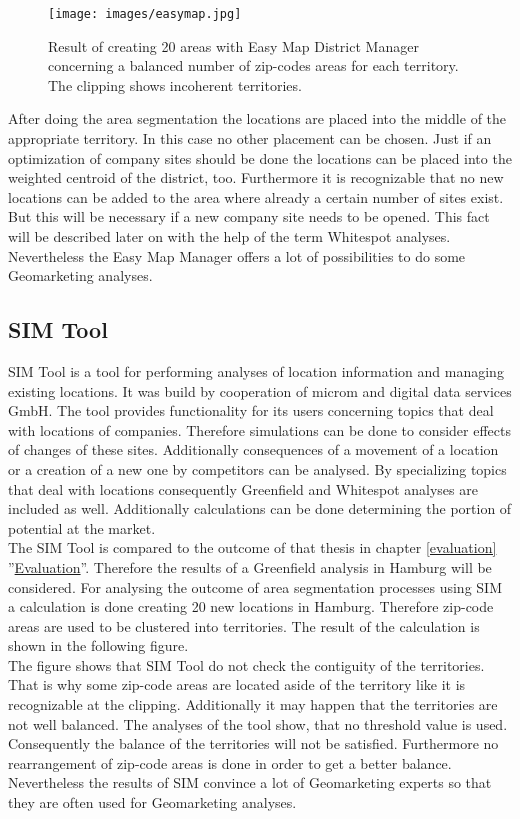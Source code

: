 \begin{figure}[H]
	\centering
	\texttt{[image: images/easymap.jpg]}
	\caption[Result of creating 20 areas with Easy Map District Manager concerning a balanced number of zip-codes areas for each territory.]{Result of creating 20 areas with Easy Map District Manager concerning a balanced number of zip-codes areas for each territory. The clipping shows incoherent territories.}
\end{figure}


After doing the area segmentation the locations are placed into the middle of the appropriate territory. In this case no other placement can be chosen. Just if an optimization of company sites should be done the locations can be placed into the weighted centroid of the district, too. Furthermore it is recognizable that no new locations can be added to the area where already a certain number of sites exist. But this will be necessary if a new company site needs to be opened. This fact will be described later on with the help of the term Whitespot analyses. Nevertheless the Easy Map Manager offers a lot of possibilities to do some Geomarketing analyses.  

\newpage
\subsection{SIM Tool}
SIM Tool is a tool for performing analyses of location information and managing existing locations. It was build by cooperation of microm and digital data services GmbH. The tool provides functionality for its users concerning topics that deal with locations of companies. Therefore simulations can be done to consider effects of changes of these sites. Additionally consequences of a movement of a location or a creation of a new one by competitors can be analysed. By specializing topics that deal with locations consequently Greenfield and Whitespot analyses are included as well. Additionally calculations can be done determining the portion of potential at the market. \\
The SIM Tool is compared to the outcome of that thesis in chapter \ref{evaluation} ''\hyperref[evaluation]{Evaluation}''. Therefore the results of a Greenfield analysis in Hamburg will be considered. For analysing the outcome of area segmentation processes using SIM a calculation is done creating 20 new locations in Hamburg. Therefore zip-code areas are used to be clustered into territories. The result of the calculation is shown in the following figure. \\
The figure shows that SIM Tool do not check the contiguity of the territories. That is why some zip-code areas are located aside of the territory like it is recognizable at the clipping. Additionally it may happen that the territories are not well balanced. The analyses of the tool show, that no threshold value is used. Consequently the balance of the territories will not be satisfied. Furthermore no rearrangement of zip-code areas is done in order to get a better balance. Nevertheless the results of SIM convince a lot of Geomarketing experts so that they are often used for Geomarketing analyses.


